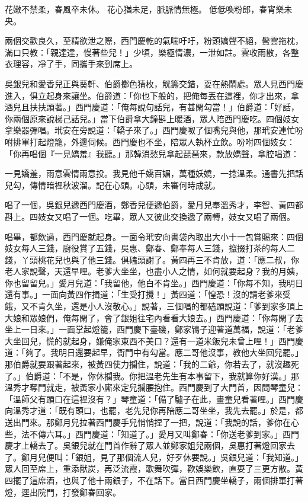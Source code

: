 花嫩不禁柔，春風卒未休。
花心猶未足，脈脈情無極。
低低喚粉郎，春宵樂未央。

兩個交歡良久，至精欲泄之際，西門慶乾的氣喘吁吁，粉頭嬌聲不絕，鬢雲拖枕，滿口只教：「親達達，慢著些兒！」少頃，樂極情濃，一泄如註。雲收雨散，各整衣理容，凈了手，同攜手來到席上。

吳銀兒和愛香兒正與葵軒、伯爵擲色猜枚，觥籌交錯，耍在熱鬧處。眾人見西門慶進入，俱立起身來讓坐。伯爵道：「你也下般的，把俺每丟在這裡，你才出來，拿酒兒且扶扶頭著。」西門慶道：「俺每說句話兒，有甚閑勾當！」伯爵道：「好話，你兩個原來說梯己話兒。」當下伯爵拿大鐘斟上暖酒，眾人陪西門慶吃。四個妓女拿樂器彈唱。玳安在旁說道：「轎子來了。」西門慶呶了個嘴兒與他，那玳安連忙吩咐排軍打起燈籠，外邊伺候。西門慶也不坐，陪眾人執杯立飲。吩咐四個妓女：「你再唱個『一見嬌羞』我聽。」那韓消愁兒拿起琵琶來，款放嬌聲，拿腔唱道：

一見嬌羞，雨意雲情兩意投。我見他千嬌百媚，萬種妖嬈，一捻溫柔。通書先把話兒勾，傳情暗裡秋波溜。記在心頭。心頭，未審何時成就。

唱了一個，吳銀兒遞西門慶酒，鄭香兒便遞伯爵，愛月兒奉溫秀才，李智、黃四都斟上。四妓女又唱了一個。吃畢，眾人又彼此交換遞了兩轉，妓女又唱了兩個。

唱畢，都飲過，西門慶就起身。一面令玳安向書袋內取出大小十一包賞賜來：四個妓女每人三錢，廚役賞了五錢，吳惠、鄭春、鄭奉每人三錢，攛掇打茶的每人二錢，丫頭桃花兒也與了他三錢。俱磕頭謝了。黃四再三不肯放，道：「應二叔，你老人家說聲，天還早哩。老爹大坐坐，也盡小人之情，如何就要起身？我的月姨，你也留留兒。」愛月兒道：「我留他，他白不肯坐。」西門慶道：「你每不知，我明日還有事。」一面向黃四作揖道：「生受打攪！」黃四道：「惶恐！沒的請老爹來受餓，又不肯久坐，還是小人沒敬心。」說著，三個唱的都磕頭說道：「爹到家多頂上大娘和眾娘們，俺每閑了，會了銀姐往宅內看看大娘去。」西門慶道：「你每閑了去坐上一日來。」一面掌起燈籠，西門慶下臺磯，鄭家鴇子迎著道萬福，說道：「老爹大坐回兒，慌的就起身，嫌俺家東西不美口？還有一道米飯兒未曾上哩！」西門慶道：「夠了。我明日還要起早，衙門中有勾當。應二哥他沒事，教他大坐回兒罷。」那伯爵就要跟著起來，被黃四使力攔住，說道：「我的二爺，你若去了，就沒趣死了。」伯爵道：「不是，你休攔我。你把溫老先生有本事留下，我就算你好漢。」那溫秀才奪門就走，被黃家小廝來定兒攔腰抱住。西門慶到了大門首，因問琴童兒：「溫師父有頭口在這裡沒有？」琴童道：「備了驢子在此，畫童兒看著哩。」西門慶向溫秀才道：「既有頭口，也罷，老先兒你再陪應二哥坐坐，我先去罷。」於是，都送出門來。那鄭月兒拉著西門慶手兒悄悄捏了一把，說道：「我說的話，爹你在心些，法不傳六耳。」西門慶道：「知道了。」愛月又叫鄭春：「你送老爹到家。」西門慶才上轎去了。吳銀兒就在門首作辭了眾人並鄭家姐兒兩個，吳惠打著燈回家去了。鄭月兒便叫：「銀姐，見了那個流人兒，好歹休要說。」吳銀兒道：「我知道。」眾人回至席上，重添獸炭，再泛流霞，歌舞吹彈，歡娛樂飲，直耍了三更方散。黃四擺了這席酒，也與了他十兩銀子，不在話下。當日西門慶坐轎子，兩個排軍打著燈，逕出院門，打發鄭春回家。

